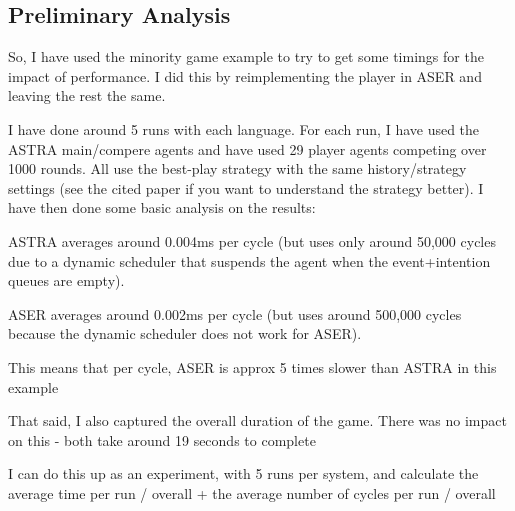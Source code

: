 \subsection{Preliminary Analysis}
\label{performance}


So, I have used the minority game example to try to get some timings for the impact of performance. I did this by reimplementing the player in ASER and leaving the rest the same.

I have done around 5 runs with each language. For each run, I have used the ASTRA main/compere agents and have used 29 player agents competing over 1000 rounds. All use the best-play strategy with the same history/strategy settings (see the cited paper if you want to understand the strategy better). I have then done some basic analysis on the results:

ASTRA averages around 0.004ms per cycle (but uses only around 50,000 cycles due to a dynamic scheduler that suspends the agent when the event+intention queues are empty).

ASER averages around 0.002ms per cycle (but uses around 500,000 cycles because the dynamic scheduler does not work for ASER).

This means that per cycle, ASER is approx 5 times slower than ASTRA in this example

That said, I also captured the overall duration of the game. There was no impact on this - both take around 19 seconds to complete

I can do this up as an experiment, with 5 runs per system, and calculate the average time per run / overall + the average number of cycles per run / overall